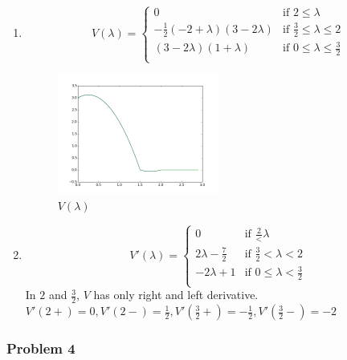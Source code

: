 \documentclass[12pt]{article}
\newcommand{\Q}[1]{\subsubsection*{Problem #1}}
\begin{document}
\begin{enumerate}
\item  

  \[
    V(\lambda) =
    \left\{
      \begin{array}{cl}
        0           & \text{if $2 \le \lambda$}\\
        -\frac12 (-2+\lambda)(3-2\lambda)& \text{if $\frac{3}{2} \le \lambda\le 2$}\\
        (3-2\lambda)(1+\lambda) & \text{if $0 \le \lambda \le \frac 32$}\\
      \end{array}
    \right.
  \]

  \begin{figure}[H]
    \centering
    \includegraphics[width=0.5\textwidth]{q3.png}
  \caption{$V(\lambda)$}
  \end{figure}

\item
  \[
    V'(\lambda) =
    \left\{
      \begin{array}{cl}
        0           & \text{if $\frac 2 < \lambda$}\\
        2\lambda - \frac72           & \text{if $\frac 32 < \lambda < 2$}\\
        -2\lambda+1 & \text{if $0 \le \lambda < \frac 32$}\\
      \end{array}
    \right.
  \]
  In $2$ and $\frac{3}{2}$, $V$ has only right and left derivative.
  $V'(2+) = 0, V'(2-) = \frac12, V'(\frac32+) = -\frac12, V'(\frac32-) = -2$
\end{enumerate}

\Q{4}
\end{document}
